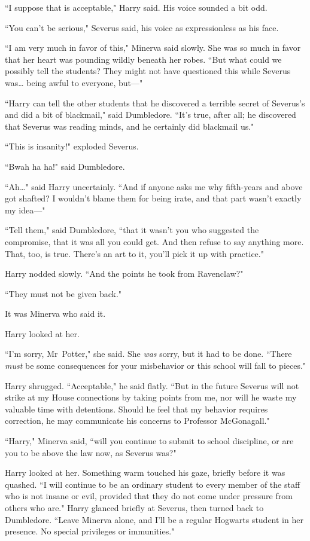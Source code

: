 ``I suppose that is acceptable," Harry said. His voice sounded a bit odd.

``You can't be serious," Severus said, his voice as expressionless as his face.

``I am very much in favor of this," Minerva said slowly. She was so much in favor that her heart was pounding wildly beneath her robes. ``But what could we possibly tell the students? They might not have questioned this while Severus was{\ldots} being awful to everyone, but—"

``Harry can tell the other students that he discovered a terrible secret of Severus's and did a bit of blackmail," said Dumbledore. ``It's true, after all; he discovered that Severus was reading minds, and he certainly did blackmail us."

``This is insanity!" exploded Severus.

``Bwah ha ha!" said Dumbledore.

``Ah{\ldots}" said Harry uncertainly. ``And if anyone asks me why fifth-years and above got shafted? I wouldn't blame them for being irate, and that part wasn't exactly my idea—"

``Tell them," said Dumbledore, ``that it wasn't you who suggested the compromise, that it was all you could get. And then refuse to say anything more. That, too, is true. There's an art to it, you'll pick it up with practice."

Harry nodded slowly. ``And the points he took from Ravenclaw?"

``They must not be given back."

It was Minerva who said it.

Harry looked at her.

``I'm sorry, Mr~Potter," she said. She \emph{was} sorry, but it had to be done. ``There \emph{must} be some consequences for your misbehavior or this school will fall to pieces."

Harry shrugged. ``Acceptable," he said flatly. ``But in the future Severus will not strike at my House connections by taking points from me, nor will he waste my valuable time with detentions. Should he feel that my behavior requires correction, he may communicate his concerns to Professor McGonagall."

``Harry," Minerva said, ``will you continue to submit to school discipline, or are you to be above the law now, as Severus was?"

Harry looked at her. Something warm touched his gaze, briefly before it was quashed. ``I will continue to be an ordinary student to every member of the staff who is not insane or evil, provided that they do not come under pressure from others who are." Harry glanced briefly at Severus, then turned back to Dumbledore. ``Leave Minerva alone, and I'll be a regular Hogwarts student in her presence. No special privileges or immunities."

